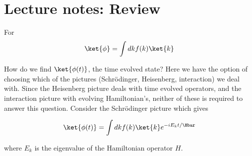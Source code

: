%
%
\section{Lecture notes: Review}

For
\begin{equation}\label{eqn:lecture5BigReviewCh3Dynamical:20}
\ket{\phi} = \int dk f(k) \ket{k}
\end{equation}

How do we find \(\ket{\phi(t)}\), the time evolved state?  Here we have the option of choosing which of the pictures (Schr\"{o}dinger, Heisenberg, interaction) we deal with.  Since the Heisenberg picture deals with time evolved operators, and the interaction picture with evolving Hamiltonian's, neither of these is required to answer this question.  Consider the Schr\"{o}dinger picture which gives

\begin{equation}\label{eqn:lecture5BigReviewCh3Dynamical:40}
\ket{\phi(t)} = \int dk f(k) \ket{k} e^{-i E_k t/\Hbar}
\end{equation}

where \(E_k\) is the eigenvalue of the Hamiltonian operator \(H\).


